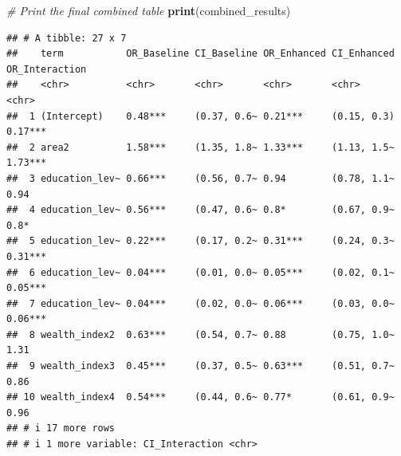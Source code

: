 \documentclass[
]{article}
\newenvironment{Shaded}{\begin{snugshade}}{\end{snugshade}}
\newcommand{\CommentTok}[1]{\textcolor[rgb]{0.56,0.35,0.01}{\textit{#1}}}
\newcommand{\FunctionTok}[1]{\textcolor[rgb]{0.13,0.29,0.53}{\textbf{#1}}}
\newcommand{\NormalTok}[1]{#1}
\begin{document}
\begin{Shaded}
\begin{Highlighting}[]
\CommentTok{\# Print the final combined table}
\FunctionTok{print}\NormalTok{(combined\_results)}
\end{Highlighting}
\end{Shaded}

\begin{verbatim}
## # A tibble: 27 x 7
##    term           OR_Baseline CI_Baseline OR_Enhanced CI_Enhanced OR_Interaction
##    <chr>          <chr>       <chr>       <chr>       <chr>       <chr>         
##  1 (Intercept)    0.48***     (0.37, 0.6~ 0.21***     (0.15, 0.3) 0.17***       
##  2 area2          1.58***     (1.35, 1.8~ 1.33***     (1.13, 1.5~ 1.73***       
##  3 education_lev~ 0.66***     (0.56, 0.7~ 0.94        (0.78, 1.1~ 0.94          
##  4 education_lev~ 0.56***     (0.47, 0.6~ 0.8*        (0.67, 0.9~ 0.8*          
##  5 education_lev~ 0.22***     (0.17, 0.2~ 0.31***     (0.24, 0.3~ 0.31***       
##  6 education_lev~ 0.04***     (0.01, 0.0~ 0.05***     (0.02, 0.1~ 0.05***       
##  7 education_lev~ 0.04***     (0.02, 0.0~ 0.06***     (0.03, 0.0~ 0.06***       
##  8 wealth_index2  0.63***     (0.54, 0.7~ 0.88        (0.75, 1.0~ 1.31          
##  9 wealth_index3  0.45***     (0.37, 0.5~ 0.63***     (0.51, 0.7~ 0.86          
## 10 wealth_index4  0.54***     (0.44, 0.6~ 0.77*       (0.61, 0.9~ 0.96          
## # i 17 more rows
## # i 1 more variable: CI_Interaction <chr>
\end{verbatim}
\end{document}
